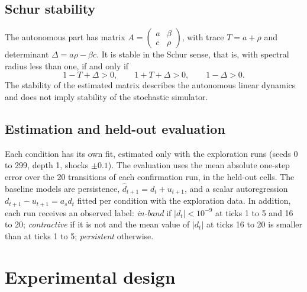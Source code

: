 \subsection{Schur stability}

The autonomous part has matrix $A=\begin{pmatrix} a & \beta\\ c & \rho\end{pmatrix}$, with trace $T=a+\rho$ and determinant $\Delta=a\rho-\beta c$. It is stable in the Schur sense, that is, with spectral radius less than one, if and only if \cite{jury1962simplified,schur1917potenzreihen,elaydi2005difference}
\begin{equation}
  1-T+\Delta>0,\qquad 1+T+\Delta>0,\qquad 1-\Delta>0.
  \label{eq:schur}
\end{equation}
The stability of the estimated matrix describes the autonomous linear dynamics and does not imply stability of the stochastic simulator.

\subsection{Estimation and held-out evaluation}

Each condition has its own fit, estimated only with the exploration runs (seeds 0 to 299, depth 1, shocks $\pm0.1$). The evaluation uses the mean absolute one-step error over the 20 transitions of each confirmation run, in the held-out cells. The baseline models are persistence, $\hat d_{t+1}=d_t+u_{t+1}$, and a scalar autoregression $d_{t+1}-u_{t+1}=a_s d_t$ fitted per condition with the exploration data. In addition, each run receives an observed label: \emph{in-band} if $|d_t|<10^{-9}$ at ticks 1 to 5 and 16 to 20; \emph{contractive} if it is not and the mean value of $|d_t|$ at ticks 16 to 20 is smaller than at ticks 1 to 5; \emph{persistent} otherwise.

\section{Experimental design}

